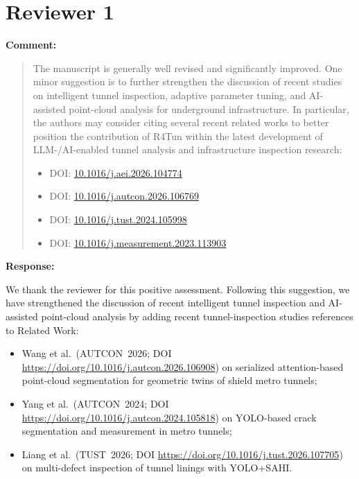 \documentclass[11pt,a4paper]{article}
\newenvironment{commentblock}{%
  \par\smallskip\noindent\textbf{Comment:}\par
  \begin{quote}\itshape\color{black}
}{%
  \end{quote}\smallskip
}
\newenvironment{responseblock}{%
  \par\smallskip\noindent\textbf{Response:}\par
  \begingroup\color{responsegreen}
}{%
  \endgroup\smallskip
}
\begin{document}
\section*{Reviewer 1}

\begin{commentblock}
The manuscript is generally well revised and significantly improved. One minor suggestion is to further strengthen the discussion of recent studies on intelligent tunnel inspection, adaptive parameter tuning, and AI-assisted point-cloud analysis for underground infrastructure. In particular, the authors may consider citing several recent related works to better position the contribution of R4Tun within the latest development of LLM-/AI-enabled tunnel analysis and infrastructure inspection research:
\begin{itemize}[nosep]
  \item DOI: \url{10.1016/j.aei.2026.104774}
  \item DOI: \url{10.1016/j.autcon.2026.106769}
  \item DOI: \url{10.1016/j.tust.2024.105998}
  \item DOI: \url{10.1016/j.measurement.2023.113903}
\end{itemize}
\end{commentblock}
\begin{responseblock}
We thank the reviewer for this positive assessment. Following this suggestion, we have strengthened the discussion of recent intelligent tunnel inspection and AI-assisted point-cloud analysis by adding recent tunnel-inspection studies references to Related Work:
\begin{itemize}[nosep]
  \item Wang et al.\ (AUTCON~2026; DOI \url{https://doi.org/10.1016/j.autcon.2026.106908}) on serialized attention-based point-cloud segmentation for geometric twins of shield metro tunnels;
  \item Yang et al.\ (AUTCON~2024; DOI \url{https://doi.org/10.1016/j.autcon.2024.105818}) on YOLO-based crack segmentation and measurement in metro tunnels;
  \item Liang et al.\ (TUST~2026; DOI \url{https://doi.org/10.1016/j.tust.2026.107705}) on multi-defect inspection of tunnel linings with YOLO+SAHI.
\end{itemize}
\end{responseblock}
\end{document}

